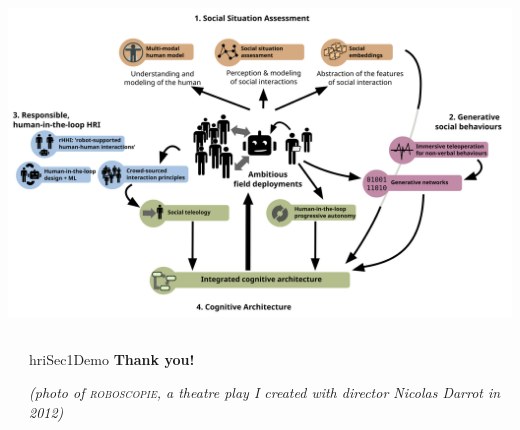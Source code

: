\documentclass[xcolor=table]{beamer}
\makeatletter
\def\beamer@writeslidentry@miniframesoff{%
  \expandafter\beamer@ifempty\expandafter{\beamer@framestartpage}{}%
  {%
    \clearpage\beamer@notesactions%
  }
}
\newcommand*{\miniframesoff}{\let\beamer@writeslidentry=\beamer@writeslidentry@miniframesoff}
\makeatother
\begin{document}
\begin{frame}
\begin{center}
{        \includegraphics[trim=8cm 0 8cm 16cm,clip,width=\linewidth]{architectures/wps}
    }
    \end{center}
\end{frame}





\miniframesoff{}


{
    \begin{frame}[plain]

        \begin{columns}
            \begin{column}{0.6\linewidth}
            \end{column}
            \begin{column}{0.4\linewidth}

                \vspace{6em}
                \begin{beamercolorbox}[wd=\linewidth,ht=6ex,dp=0.7ex]{hriSec1Demo}
                    \textbf{Thank you!}
                \end{beamercolorbox}
                \vspace{12em}
                {\scriptsize
                \textcolor{white!60!black}{\emph{(photo of 
                \textsc{roboscopie}, a theatre play I created with director Nicolas Darrot in
                2012)}}
                }
            \end{column}
        \end{columns}
    \end{frame}
}
\end{document}
